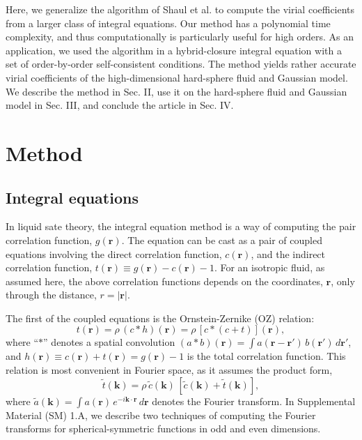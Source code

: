 \documentclass[aip,jcp,preprint,superscriptaddress,showpacs,preprintnumbers,amsmath,amssymb]{revtex4-1}
\newcommand{\vct}[1]{\mathbf{#1}}
\providecommand{\vr}{} %
\renewcommand{\vr}{\vct{r}}
\newcommand{\vk}{\vct{k}}
\begin{document}
Here,
we generalize the algorithm of Shaul et al.\cite{shaul2011}
to compute the virial coefficients
from a larger class of integral equations.
%
Our method has a polynomial time complexity,
and thus computationally is particularly useful
for high orders.
%
As an application,
we used the algorithm in a hybrid-closure integral equation
with a set of order-by-order self-consistent conditions.
%
The method yields rather accurate virial coefficients
of the high-dimensional hard-sphere fluid and Gaussian model.
%
We describe the method in Sec. II,
use it on the hard-sphere fluid and Gaussian model in Sec. III,
and conclude the article in Sec. IV.




\section{Method}





\subsection{Integral equations}




In liquid sate theory,
the integral equation method\cite{hansen}
is a way of computing the pair correlation function, $g(\vr)$.
%
The equation can be cast as a pair of coupled equations
involving the direct correlation function, $c(\vr)$,
and the indirect correlation function,
$t(\vr) \equiv g(\vr) - c(\vr) - 1$.
%
For an isotropic fluid, as assumed here,
the above correlation functions
depends on the coordinates, $\vr$,
only through the distance, $r = |\vr|$.



The first of the coupled equations
is the Ornstein-Zernike (OZ) relation:
%
%
%
\begin{equation}
t(\vr)
=
\rho \, (c*h)(\vr)
= \rho \, [c*(c+t)](\vr),
\label{eq:oz}
\end{equation}
%
%
%
where ``$*$'' denotes a spatial convolution
$(a*b)(\vr) = \int a(\vr - \vr') \, b(\vr') \, d\vr'$,
and
$h(\vr) \equiv c(\vr) + t(\vr) = g(\vr) - 1$
is the total correlation function.
%
This relation is most convenient in Fourier space,
as it assumes the product form,
%
%
%
\begin{equation}
\tilde t(\vk)
=
\rho \, \tilde c(\vk)
\, [ \tilde c(\vk) + \tilde t(\vk) ],
\label{eq:oz_k}
\end{equation}
%
%
%
where
$\tilde a(\vk) = \int a(\vr) \, e^{-i\vk \cdot \vr} \, d\vr$
denotes the Fourier transform.
%
In Supplemental Material (SM) 1.A,
we describe two techniques
of computing the Fourier transforms
for spherical-symmetric functions
in odd and even dimensions.
\end{document}

